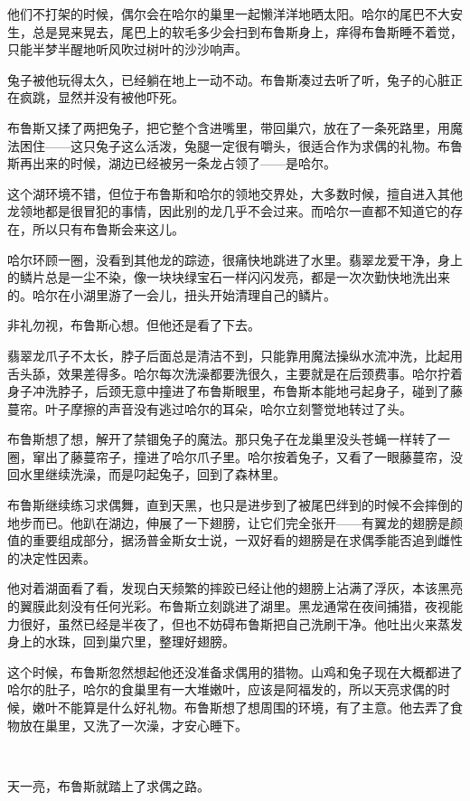 \documentclass[../main.tex]{subfiles}
\begin{document}
他们不打架的时候，偶尔会在哈尔的巢里一起懒洋洋地晒太阳。哈尔的尾巴不大安生，总是晃来晃去，尾巴上的软毛多少会扫到布鲁斯身上，痒得布鲁斯睡不着觉，只能半梦半醒地听风吹过树叶的沙沙响声。

兔子被他玩得太久，已经躺在地上一动不动。布鲁斯凑过去听了听，兔子的心脏正在疯跳，显然并没有被他吓死。

布鲁斯又揉了两把兔子，把它整个含进嘴里，带回巢穴，放在了一条死路里，用魔法困住——这只兔子这么活泼，兔腿一定很有嚼头，很适合作为求偶的礼物。布鲁斯再出来的时候，湖边已经被另一条龙占领了——是哈尔。

这个湖环境不错，但位于布鲁斯和哈尔的领地交界处，大多数时候，擅自进入其他龙领地都是很冒犯的事情，因此别的龙几乎不会过来。而哈尔一直都不知道它的存在，所以只有布鲁斯会来这儿。

哈尔环顾一圈，没看到其他龙的踪迹，很痛快地跳进了水里。翡翠龙爱干净，身上的鳞片总是一尘不染，像一块块绿宝石一样闪闪发亮，都是一次次勤快地洗出来的。哈尔在小湖里游了一会儿，扭头开始清理自己的鳞片。

非礼勿视，布鲁斯心想。但他还是看了下去。

翡翠龙爪子不太长，脖子后面总是清洁不到，只能靠用魔法操纵水流冲洗，比起用舌头舔，效果差得多。哈尔每次洗澡都要洗很久，主要就是在后颈费事。哈尔拧着身子冲洗脖子，后颈无意中撞进了布鲁斯眼里，布鲁斯本能地弓起身子，碰到了藤蔓帘。叶子摩擦的声音没有逃过哈尔的耳朵，哈尔立刻警觉地转过了头。

布鲁斯想了想，解开了禁锢兔子的魔法。那只兔子在龙巢里没头苍蝇一样转了一圈，窜出了藤蔓帘子，撞进了哈尔爪子里。哈尔按着兔子，又看了一眼藤蔓帘，没回水里继续洗澡，而是叼起兔子，回到了森林里。

布鲁斯继续练习求偶舞，直到天黑，也只是进步到了被尾巴绊到的时候不会摔倒的地步而已。他趴在湖边，伸展了一下翅膀，让它们完全张开——有翼龙的翅膀是颜值的重要组成部分，据汤普金斯女士说，一双好看的翅膀是在求偶季能否追到雌性的决定性因素。

他对着湖面看了看，发现白天频繁的摔跤已经让他的翅膀上沾满了浮灰，本该黑亮的翼膜此刻没有任何光彩。布鲁斯立刻跳进了湖里。黑龙通常在夜间捕猎，夜视能力很好，虽然已经是半夜了，但也不妨碍布鲁斯把自己洗刷干净。他吐出火来蒸发身上的水珠，回到巢穴里，整理好翅膀。

这个时候，布鲁斯忽然想起他还没准备求偶用的猎物。山鸡和兔子现在大概都进了哈尔的肚子，哈尔的食巢里有一大堆嫩叶，应该是阿福发的，所以天亮求偶的时候，嫩叶不能算是什么好礼物。布鲁斯想了想周围的环境，有了主意。他去弄了食物放在巢里，又洗了一次澡，才安心睡下。

~\

天一亮，布鲁斯就踏上了求偶之路。
\end{document}
